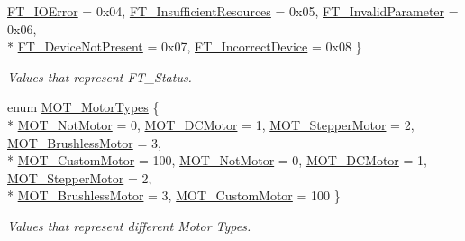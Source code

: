 \begin{DoxyCompactItemize}
\hyperlink{group___common_gga9de42f4b466f017bd6daf4e230259f63a51deb65a356d1b1c0e90f62404efcc29}{F\+T\+\_\+\+I\+O\+Error} = 0x04, 
\hyperlink{group___common_gga9de42f4b466f017bd6daf4e230259f63a6af4fbc8e683431beb65cce312c32fa1}{F\+T\+\_\+\+Insufficient\+Resources} = 0x05, 
\hyperlink{group___common_gga9de42f4b466f017bd6daf4e230259f63af677e4e362188f7700de9148a19f3191}{F\+T\+\_\+\+Invalid\+Parameter} = 0x06, 
\\*
\hyperlink{group___common_gga9de42f4b466f017bd6daf4e230259f63afea2827628e7f1d1fda4338df66236a6}{F\+T\+\_\+\+Device\+Not\+Present} = 0x07, 
\hyperlink{group___common_gga9de42f4b466f017bd6daf4e230259f63aca07e33d55138391799f473adeb00140}{F\+T\+\_\+\+Incorrect\+Device} = 0x08
 \}\begin{DoxyCompactList}\small\item\em Values that represent F\+T\+\_\+\+Status. \end{DoxyCompactList}
\item 
enum \hyperlink{group___common_gac8faf0d1045d287ba4c1013ab2cfffca}{M\+O\+T\+\_\+\+Motor\+Types} \{ \\*
\hyperlink{group___common_ggac8faf0d1045d287ba4c1013ab2cfffcaa3e5f356a974fbc8fc77aaee0c23e9823}{M\+O\+T\+\_\+\+Not\+Motor} = 0, 
\hyperlink{group___common_ggac8faf0d1045d287ba4c1013ab2cfffcaae809a2bdcfac7b65215843f2aea2086b}{M\+O\+T\+\_\+\+D\+C\+Motor} = 1, 
\hyperlink{group___common_ggac8faf0d1045d287ba4c1013ab2cfffcaa1bd60821ae7e83a8ba8a79d529c91c24}{M\+O\+T\+\_\+\+Stepper\+Motor} = 2, 
\hyperlink{group___common_ggac8faf0d1045d287ba4c1013ab2cfffcaafb1b86ae08192aaa9a7b267aed37773a}{M\+O\+T\+\_\+\+Brushless\+Motor} = 3, 
\\*
\hyperlink{group___common_ggac8faf0d1045d287ba4c1013ab2cfffcaa698b77fc6f67abd028d5f371dfca8eda}{M\+O\+T\+\_\+\+Custom\+Motor} = 100, 
\hyperlink{group___common_ggac8faf0d1045d287ba4c1013ab2cfffcaa3e5f356a974fbc8fc77aaee0c23e9823}{M\+O\+T\+\_\+\+Not\+Motor} = 0, 
\hyperlink{group___common_ggac8faf0d1045d287ba4c1013ab2cfffcaae809a2bdcfac7b65215843f2aea2086b}{M\+O\+T\+\_\+\+D\+C\+Motor} = 1, 
\hyperlink{group___common_ggac8faf0d1045d287ba4c1013ab2cfffcaa1bd60821ae7e83a8ba8a79d529c91c24}{M\+O\+T\+\_\+\+Stepper\+Motor} = 2, 
\\*
\hyperlink{group___common_ggac8faf0d1045d287ba4c1013ab2cfffcaafb1b86ae08192aaa9a7b267aed37773a}{M\+O\+T\+\_\+\+Brushless\+Motor} = 3, 
\hyperlink{group___common_ggac8faf0d1045d287ba4c1013ab2cfffcaa698b77fc6f67abd028d5f371dfca8eda}{M\+O\+T\+\_\+\+Custom\+Motor} = 100
 \}\begin{DoxyCompactList}\small\item\em Values that represent different Motor Types. \end{DoxyCompactList}

\end{DoxyCompactItemize}

